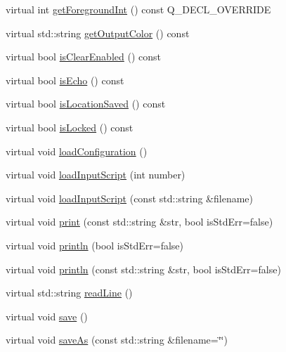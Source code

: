 \begin{DoxyCompactItemize}
\item 
virtual int \mbox{\hyperlink{classGConsoleWindow_a88306467e229356d53f18913d7e167d1}{get\+Foreground\+Int}} () const Q\+\_\+\+D\+E\+C\+L\+\_\+\+O\+V\+E\+R\+R\+I\+DE
\item 
virtual std\+::string \mbox{\hyperlink{classGConsoleWindow_a3da845f74a7bc662249a3d48435c876a}{get\+Output\+Color}} () const
\item 
virtual bool \mbox{\hyperlink{classGConsoleWindow_a3df15bed8a6745a71a302ad90f646881}{is\+Clear\+Enabled}} () const
\item 
virtual bool \mbox{\hyperlink{classGConsoleWindow_ab905abf66ffd6d77296ce3c68d9b56c6}{is\+Echo}} () const
\item 
virtual bool \mbox{\hyperlink{classGConsoleWindow_a7ccb98397bfd45c9e7dd05691be4b190}{is\+Location\+Saved}} () const
\item 
virtual bool \mbox{\hyperlink{classGConsoleWindow_a43966e19963e4bcb7f7f9b5327ec732b}{is\+Locked}} () const
\item 
virtual void \mbox{\hyperlink{classGConsoleWindow_a9aa1b236d77d8372bc8415f017204fe8}{load\+Configuration}} ()
\item 
virtual void \mbox{\hyperlink{classGConsoleWindow_a827fbc628f8d13433e5fec3b46231e1d}{load\+Input\+Script}} (int number)
\item 
virtual void \mbox{\hyperlink{classGConsoleWindow_aedd35f4cb6d9a0415bc9e459109708f4}{load\+Input\+Script}} (const std\+::string \&filename)
\item 
virtual void \mbox{\hyperlink{classGConsoleWindow_ac831fb387a60832c0c907236a8b5c0a1}{print}} (const std\+::string \&str, bool is\+Std\+Err=false)
\item 
virtual void \mbox{\hyperlink{classGConsoleWindow_abe18d4a78b8f66b9ac882c5561787ade}{println}} (bool is\+Std\+Err=false)
\item 
virtual void \mbox{\hyperlink{classGConsoleWindow_aab7a464f68bc74567f2370fa03c61443}{println}} (const std\+::string \&str, bool is\+Std\+Err=false)
\item 
virtual std\+::string \mbox{\hyperlink{classGConsoleWindow_a889e9bbe7d0bcf8206320094d538f4b6}{read\+Line}} ()
\item 
virtual void \mbox{\hyperlink{classGConsoleWindow_aae2c382151ef7c9aa913361172b30db6}{save}} ()
\item 
virtual void \mbox{\hyperlink{classGConsoleWindow_a7be1f340a7a83cab38ed53f1322b86b7}{save\+As}} (const std\+::string \&filename=\char`\"{}\char`\"{})
\item 

\end{DoxyCompactItemize}
